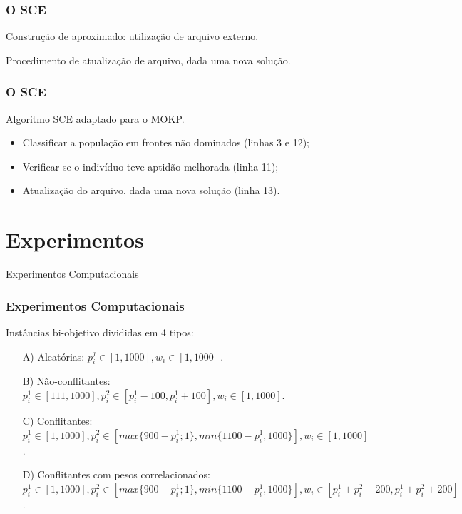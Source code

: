 \documentclass[10pt,xcolor=table,fleqn]{beamer}
\newcommand{\mytitle}[1]{
  \begin{center}
    \color{defblue}
    { \LARGE #1 }
  \end{center}
}
\begin{document}
\begin{frame}
	\frametitle{O SCE}
  Construção de \paretoset{} aproximado: utilização de arquivo externo.
  \vfill
  \begin{algorithm}[H]
    \footnotesize
    
    \caption{Procedimento de atualização de arquivo, dada uma nova solução.}
    \label{alg:archupdate}
  \end{algorithm}
\end{frame}

\begin{frame}
	\frametitle{O SCE}
  \begin{algorithm}[H]
    \tiny
    
    \caption{Algoritmo SCE adaptado para o MOKP.}
  \end{algorithm}
  \pause
  \begin{itemize}
    \small
    \item{Classificar a população em frontes não dominados (linhas 3 e 12);}
    \item{Verificar se o indivíduo teve aptidão melhorada (linha 11);}
    \item{Atualização do arquivo, dada uma nova solução (linha 13).}
  \end{itemize}
\end{frame}

\section{Experimentos}

\begin{frame}
	\mytitle{Experimentos Computacionais}
\end{frame}

\begin{frame}
	\frametitle{Experimentos Computacionais}
  Instâncias bi-objetivo divididas em 4 tipos:
  \vspace{3mm}
  \begin{enumerate}
    \item[A)] Aleatórias: $
      p^j_i \in [1, 1000],
      w_i \in [1,1000]$.
    \vspace{3mm}
    \item[B)] Não-conflitantes: $
      p^1_i \in [111, 1000],
      p^2_i \in [p^1_i - 100, p^1_i + 100],
      w_i \in [1,1000]$.
    \vspace{3mm}
    \item[C)] Conflitantes: $
      p^1_i \in [1, 1000],
      p^2_i \in [max\{900-p^1_i;1\}, min\{1100-p^1_i, 1000\}],
      w_i \in [1,1000]$.
    \vspace{3mm}
    \item[D)] Conflitantes com pesos correlacionados: $
      p^1_i \in [1, 1000],
      p^2_i \in [max\{900-p^1_i;1\}, min\{1100-p^1_i, 1000\}],
      w_i \in [p^1_i+p^2_i-200, p^1_i+p^2_i+200]$.
  \end{enumerate}
\end{frame}
\end{document}
